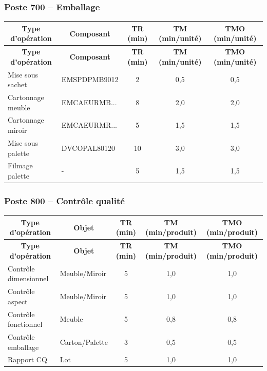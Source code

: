 \documentclass[12pt,a4paper]{article}
\begin{document}
\subsubsection{Poste 700 – Emballage}

\begin{longtable}{|p{5cm}|p{5cm}|c|c|c|}
\hline
\multicolumn{1}{|c|}{\textbf{Type d'opération}} & \multicolumn{1}{c|}{\textbf{Composant}} & \multicolumn{1}{c|}{\textbf{TR (min)}} & \multicolumn{1}{c|}{\textbf{TM (min/unité)}} & \multicolumn{1}{c|}{\textbf{TMO (min/unité)}} \\
\hline
\endfirsthead
\hline
\multicolumn{1}{|c|}{\textbf{Type d'opération}} & \multicolumn{1}{c|}{\textbf{Composant}} & \multicolumn{1}{c|}{\textbf{TR (min)}} & \multicolumn{1}{c|}{\textbf{TM (min/unité)}} & \multicolumn{1}{c|}{\textbf{TMO (min/unité)}} \\
\hline
\endhead
\hline
\endfoot
Mise sous sachet & EMSPDPMB9012 & 2 & 0,5 & 0,5 \\
Cartonnage meuble & EMCAEURMB... & 8 & 2,0 & 2,0 \\
Cartonnage miroir & EMCAEURMR... & 5 & 1,5 & 1,5 \\
Mise sous palette & DVCOPAL80120 & 10 & 3,0 & 3,0 \\
Filmage palette & - & 5 & 1,5 & 1,5 \\
\hline
\end{longtable}

\subsubsection{Poste 800 – Contrôle qualité}

\begin{longtable}{|p{5cm}|p{5cm}|c|c|c|}
\hline
\multicolumn{1}{|c|}{\textbf{Type d'opération}} & \multicolumn{1}{c|}{\textbf{Objet}} & \multicolumn{1}{c|}{\textbf{TR (min)}} & \multicolumn{1}{c|}{\textbf{TM (min/produit)}} & \multicolumn{1}{c|}{\textbf{TMO (min/produit)}} \\
\hline
\endfirsthead
\hline
\multicolumn{1}{|c|}{\textbf{Type d'opération}} & \multicolumn{1}{c|}{\textbf{Objet}} & \multicolumn{1}{c|}{\textbf{TR (min)}} & \multicolumn{1}{c|}{\textbf{TM (min/produit)}} & \multicolumn{1}{c|}{\textbf{TMO (min/produit)}} \\
\hline
\endhead
\hline
\endfoot
Contrôle dimensionnel & Meuble/Miroir & 5 & 1,0 & 1,0 \\
Contrôle aspect & Meuble/Miroir & 5 & 1,0 & 1,0 \\
Contrôle fonctionnel & Meuble & 5 & 0,8 & 0,8 \\
Contrôle emballage & Carton/Palette & 3 & 0,5 & 0,5 \\
Rapport CQ & Lot & 5 & 1,0 & 1,0 \\
\hline
\end{longtable}
\end{document}
